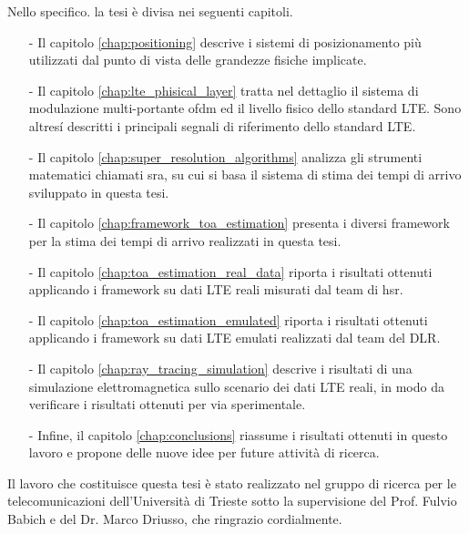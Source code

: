 Nello specifico. la tesi \`e divisa nei seguenti capitoli.
\begin{itemize}
\item[-] Il capitolo \ref{chap:positioning} descrive i sistemi di posizionamento pi\`u utilizzati dal punto di vista 
delle grandezze fisiche implicate.
\item[-] Il capitolo \ref{chap:lte_phisical_layer} tratta nel dettaglio il sistema 
di modulazione multi-portante \gls{ofdm} ed il livello fisico dello standard LTE. Sono altres\'i descritti i principali segnali 
di riferimento dello standard LTE.
\item[-] Il capitolo \ref{chap:super_resolution_algorithms} analizza gli strumenti matematici chiamati 
\acrlong{sra}, su cui si basa il sistema di stima dei tempi di arrivo sviluppato in questa tesi.
\item[-] Il capitolo \ref{chap:framework_toa_estimation} presenta i diversi framework per la stima dei tempi di arrivo realizzati in questa tesi.
\item[-] Il capitolo \ref{chap:toa_estimation_real_data} riporta i risultati ottenuti applicando i framework su dati LTE reali misurati dal team 
di \gls{hsr}.
\item[-] Il capitolo \ref{chap:toa_estimation_emulated} riporta i risultati ottenuti applicando i framework su dati LTE emulati realizzati
dal team del DLR.
\item[-] Il capitolo \ref{chap:ray_tracing_simulation} descrive i risultati di una simulazione elettromagnetica sullo scenario dei dati LTE reali,
in modo da verificare i risultati ottenuti per via sperimentale.
\item[-] Infine, il capitolo \ref{chap:conclusions} riassume i risultati ottenuti in questo lavoro e propone delle nuove idee per future attivit\`a di ricerca.
\end{itemize}
Il lavoro che costituisce questa tesi \`e stato realizzato nel gruppo di ricerca per le telecomunicazioni dell'Universit\`a di Trieste sotto la
supervisione del Prof. Fulvio Babich e del Dr. Marco Driusso, che ringrazio cordialmente.